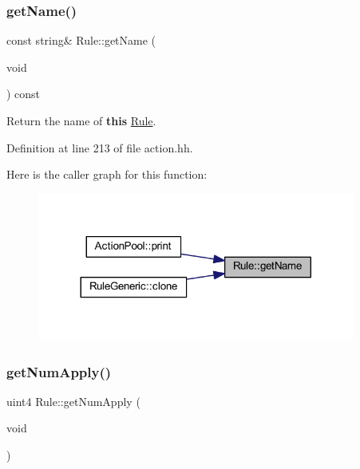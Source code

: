 \mbox{\label{class_rule_a6f9d905bc475179232607bf69a6ca8c2}} 
\subsubsection{\texorpdfstring{getName()}{getName()}}
{\footnotesize\ttfamily const string\& Rule\+::get\+Name (\begin{DoxyParamCaption}\item[{void}]{ }\end{DoxyParamCaption}) const\hspace{0.3cm}{\ttfamily [inline]}}



Return the name of {\bfseries{this}} \mbox{\hyperlink{class_rule}{Rule}}. 



Definition at line 213 of file action.\+hh.

Here is the caller graph for this function\+:
\nopagebreak
\begin{figure}[H]
\begin{center}
\leavevmode
\includegraphics[width=296pt]{class_rule_a6f9d905bc475179232607bf69a6ca8c2_icgraph}
\end{center}
\end{figure}
\mbox{\label{class_rule_a082c3f756c47649c375df160c4260992}} 
\subsubsection{\texorpdfstring{getNumApply()}{getNumApply()}}
{\footnotesize\ttfamily uint4 Rule\+::get\+Num\+Apply (\begin{DoxyParamCaption}\item[{void}]{ }\end{DoxyParamCaption})\hspace{0.3cm}{\ttfamily [inline]}}



